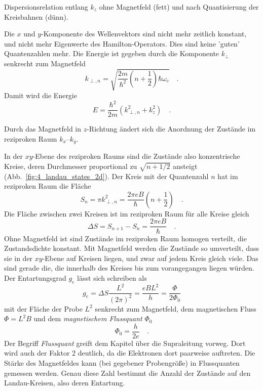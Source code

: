 \begin{marginfigure}
   \caption{Dispersionsrelation entlang $k_z$ ohne Magnetfeld (fett) und nach Quantisierung der Kreisbahnen (dünn). \label{fig:4_dispersion_3d_b}}
\end{marginfigure}

Die $x$ und $y$-Komponente des Wellenvektors sind nicht mehr zeitlich konstant, und nicht mehr Eigenwerte des Hamilton-Operators. Dies sind keine 'guten' Quantenzahlen mehr. Die Energie ist gegeben durch die Komponente $k_\perp$ senkrecht zum Magnetfeld
\begin{equation}
   k_{\perp, n} = \sqrt{ \frac{2m}{\hbar^2} \left( n + \frac{1}{2}\right) \hbar \omega_c} \quad .
\end{equation}
Damit wird die Energie 
\begin{equation}
   E  = \frac{\hbar^2}{2m}  \left( k_{\perp, n}^2 + k_z^2 \right)  \quad .
\end{equation}
%
\begin{marginfigure}
   \caption{Durch das Magnetfeld in $z$-Richtung ändert sich die Anordnung der Zustände im reziproken Raum $k_x$--$k_y$. \label{fig:4_landau_states_2d}}
\end{marginfigure}
%
In der $xy$-Ebene des reziproken Raums sind die Zustände also konzentrische Kreise, deren Durchmesser proportional zu $\sqrt{n +1/2}$ ansteigt (Abb.~\ref{fig:4_landau_states_2d}). Der Kreis mit der Quantenzahl $n$ hat im reziproken Raum die Fläche
\begin{equation}
S_n = \pi  k_{\perp, n}^2 = \frac{2 \pi e B}{\hbar} \left( n + \frac{1}{2}\right) \quad .  \label{eq:4_Sn}
\end{equation}
Die Fläche zwischen zwei Kreisen ist im reziproken Raum für alle Kreise gleich
\begin{equation}
   \Delta S = S_{n+1} - S_n = \frac{2 \pi e B}{\hbar} \quad . 
\end{equation}
Ohne Magnetfeld ist sind Zustände im reziproken Raum homogen verteilt, die Zustandsdichte konstant. Mit Magnetfeld werden die Zustände so umverteilt, dass sie in der $xy$-Ebene auf Kreisen liegen, und zwar auf jedem Kreis gleich viele. Das sind gerade die, die innerhalb des Kreises bis zum vorangegangen liegen würden. Der Entartungsgrad $g_e$ lässt sich schreiben als
\begin{equation}
   g_e =  \Delta S \frac{L^2}{(2\pi)^2} = \frac{e B L^2}{h} = \frac{\Phi}{2 \Phi_0} \label{eq:4_landau_entartung}
\end{equation}
mit der Fläche der Probe $L^2$ senkrecht zum Magnetfeld, dem magnetischen Fluss $\Phi = L^2 B$ und dem \emph{magnetischem Flussquant} $\Phi_0$
\begin{equation}
   \Phi_0 = \frac{h}{2 e} \quad .
\end{equation}
Der Begriff \emph{Flussquant} greift dem Kapitel über die Supraleitung vorweg. Dort wird auch der Faktor 2 deutlich, da die Elektronen dort paarweise auftreten. Die Stärke des Magnetfeldes kann (bei gegebener Probengröße) in Flussquanten gemessen werden. Genau diese Zahl bestimmt die Anzahl der Zustände auf den Landau-Kreisen, also deren Entartung.

